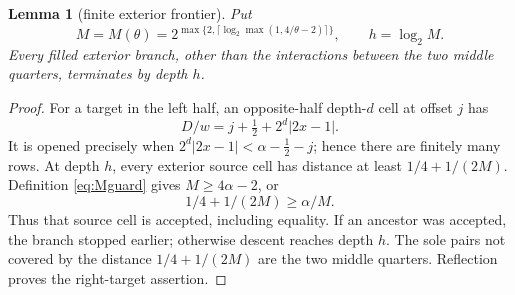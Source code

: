\documentclass[11pt]{article}
\numberwithin{equation}{section}
\newtheorem{lemma}[theorem]{Lemma}
\newcommand{\1}{\mathbf 1}\newcommand{\F}{\mathcal F}\newcommand{\D}{\mathcal D}
\begin{document}
\begin{lemma}[finite exterior frontier]\label{lem:finite-exterior}
Put
\begin{equation}
 M=M(\theta)=2^{\max\{2,\lceil\log_2\max(1,4/\theta-2)\rceil\}},\qquad h=\log_2M.
                                                               \label{eq:Mguard}
\end{equation}
Every filled exterior branch, other than the interactions between the two
middle quarters, terminates by depth $h$.
\end{lemma}
\begin{proof}
For a target in the left half, an opposite-half depth-$d$ cell at offset $j$
has
\begin{equation}D/w=j+\tfrac12+2^d|2x-1|.                    \label{eq:rowdistance}
\end{equation}
It is opened precisely when $2^d|2x-1|<\alpha-\tfrac12-j$; hence there are
finitely many rows.  At depth $h$, every exterior source cell has distance at
least $1/4+1/(2M)$.  Definition \eqref{eq:Mguard} gives
$M\ge4\alpha-2$, or
\begin{equation}1/4+1/(2M)\ge\alpha/M.                       \label{eq:guardineq-d}
\end{equation}
Thus that source cell is accepted, including equality.  If an ancestor was
accepted, the branch stopped earlier; otherwise descent reaches depth $h$.
The sole pairs not covered by the distance $1/4+1/(2M)$ are the two middle
quarters.  Reflection proves the right-target assertion.
\end{proof}
\end{document}
